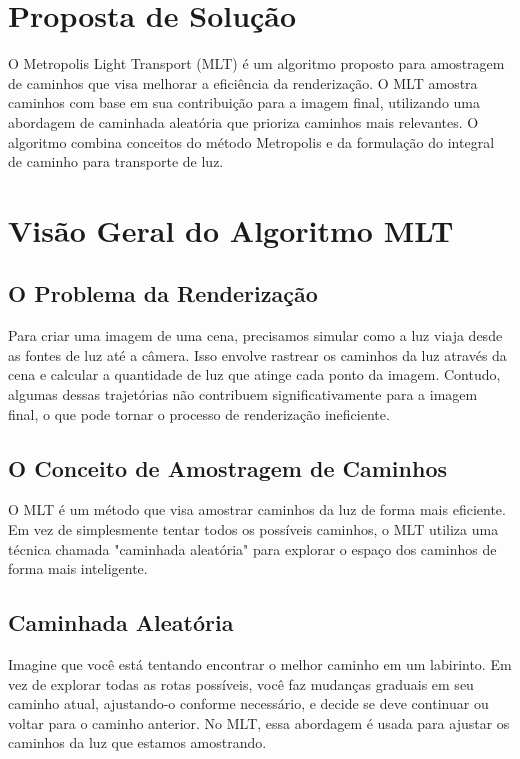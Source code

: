 \documentclass{article}
\begin{document}
\section{Proposta de Solução}
O Metropolis Light Transport (MLT) é um algoritmo proposto para amostragem de caminhos que visa melhorar a eficiência da renderização. O MLT amostra caminhos com base em sua contribuição para a imagem final, utilizando uma abordagem de caminhada aleatória que prioriza caminhos mais relevantes. O algoritmo combina conceitos do método Metropolis e da formulação do integral de caminho para transporte de luz.

\section{Visão Geral do Algoritmo MLT}
\subsection{O Problema da Renderização}

Para criar uma imagem de uma cena, precisamos simular como a luz viaja desde as fontes de luz até a câmera. Isso envolve rastrear os caminhos da luz através da cena e calcular a quantidade de luz que atinge cada ponto da imagem. Contudo, algumas dessas trajetórias não contribuem significativamente para a imagem final, o que pode tornar o processo de renderização ineficiente.

\subsection{O Conceito de Amostragem de Caminhos}

O MLT é um método que visa amostrar caminhos da luz de forma mais eficiente. Em vez de simplesmente tentar todos os possíveis caminhos, o MLT utiliza uma técnica chamada "caminhada aleatória" para explorar o espaço dos caminhos de forma mais inteligente.

\subsection{Caminhada Aleatória}

Imagine que você está tentando encontrar o melhor caminho em um labirinto. Em vez de explorar todas as rotas possíveis, você faz mudanças graduais em seu caminho atual, ajustando-o conforme necessário, e decide se deve continuar ou voltar para o caminho anterior. No MLT, essa abordagem é usada para ajustar os caminhos da luz que estamos amostrando.
\end{document}
